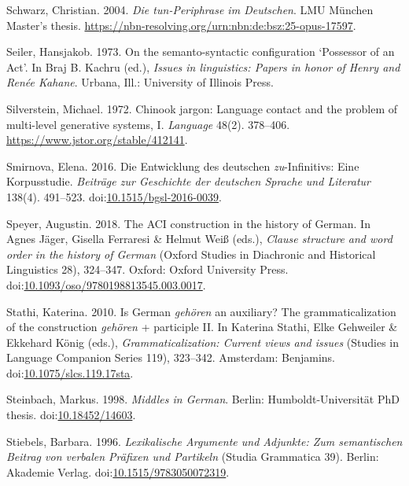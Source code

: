 \leavevmode{}%
Schwarz, Christian. 2004. \emph{Die \emph{tun}-{Periphrase} im
{Deutschen}}. LMU München Master's thesis.
\url{https://nbn-resolving.org/urn:nbn:de:bsz:25-opus-17597}.

\leavevmode{}%
Seiler, Hansjakob. 1973. On the semanto-syntactic configuration
{`{Possessor} of an {Act}'}. In Braj B. Kachru (ed.), \emph{Issues in
linguistics: Papers in honor of {Henry and Renée Kahane}}. Urbana, Ill.:
University of Illinois Press.

\leavevmode{}%
Silverstein, Michael. 1972. Chinook jargon: Language contact and the
problem of multi-level generative systems, {I}. \emph{Language} 48(2).
378--406. \url{https://www.jstor.org/stable/412141}.

\leavevmode{}%
Smirnova, Elena. 2016. Die {Entwicklung} des deutschen
\emph{zu}-{Infinitivs}: Eine {Korpusstudie}. \emph{Beiträge zur
Geschichte der deutschen Sprache und Literatur} 138(4). 491--523.
doi:\href{https://doi.org/10.1515/bgsl-2016-0039}{10.1515/bgsl-2016-0039}.

\leavevmode{}%
Speyer, Augustin. 2018. The {ACI} construction in the history of
{German}. In Agnes Jäger, Gisella Ferraresi \& Helmut Weiß (eds.),
\emph{Clause structure and word order in the history of {German}}
(Oxford Studies in Diachronic and Historical Linguistics 28), 324--347.
Oxford: Oxford University Press.
doi:\href{https://doi.org/10.1093/oso/9780198813545.003.0017}{10.1093/oso/9780198813545.003.0017}.

\leavevmode{}%
Stathi, Katerina. 2010. Is {German} \emph{gehören} an auxiliary? The
grammaticalization of the construction \emph{gehören} + participle {II}.
In Katerina Stathi, Elke Gehweiler \& Ekkehard König (eds.),
\emph{Grammaticalization: Current views and issues} (Studies in Language
Companion Series 119), 323--342. Amsterdam: Benjamins.
doi:\href{https://doi.org/10.1075/slcs.119.17sta}{10.1075/slcs.119.17sta}.

\leavevmode{}%
Steinbach, Markus. 1998. \emph{Middles in {German}}. Berlin:
Humboldt-Universität PhD thesis.
doi:\href{https://doi.org/10.18452/14603}{10.18452/14603}.

\leavevmode{}%
Stiebels, Barbara. 1996. \emph{Lexikalische {Argumente} und {Adjunkte}:
Zum semantischen {Beitrag} von verbalen {Präfixen} und {Partikeln}}
(Studia Grammatica 39). Berlin: Akademie Verlag.
doi:\href{https://doi.org/10.1515/9783050072319}{10.1515/9783050072319}.

